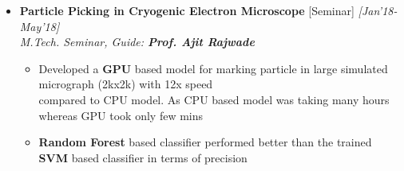 \documentclass[a4paper,10pt]{article}
\newcommand{\hsep}{-0.6cm}
\begin{document}
\begin{itemize}
\item \textbf{Particle Picking in Cryogenic Electron Microscope} [Seminar]  \hfill\emph{[Jan'18-May'18]} \\
    \emph{M.Tech. Seminar, Guide: \textbf{Prof. Ajit Rajwade}} \\[\hsep]
      \begin{itemize}
	        \item Developed a \textbf{GPU} based model for marking particle in large simulated micrograph (2kx2k) with 12x speed\\[-0.05cm] compared to CPU model. As CPU based model was taking many hours whereas GPU took only few mins \\[-0.55cm] 
	        \item \textbf{Random Forest} based classifier performed better than the trained  \textbf{SVM} based classifier in terms of precision \\[-0.55cm] 
        \end{itemize}
\end{itemize}		
\end{document}
